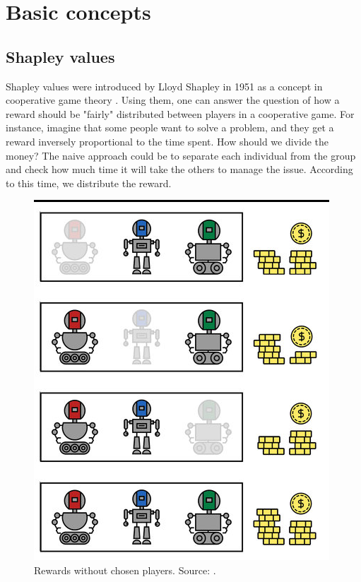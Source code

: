 \documentclass[en]{pracamgr}
\begin{document}
\chapter{Basic concepts}\label{r:concepts}


\section{Shapley values}
Shapley values were introduced by Lloyd Shapley in 1951 as a concept in cooperative game theory \cite{ShapleyValues}.
Using them, one can answer the question of how a reward should be "fairly" distributed between players in a cooperative game. For instance, imagine that some people want to solve a problem, and they get a reward inversely proportional to the time spent. How should we divide the money? The naive approach could be to separate each individual from the group and check how much time it will take the others to manage the issue. According to this time, we distribute the reward.

\begin{figure}[H]
\centering
\includegraphics[scale=0.3]{./images/Shap_coal_2.png}
\caption{Rewards without chosen players. Source: \cite{DBLP:conf/ijcai/RozemberczkiWBY22}.}
\end{figure}
\end{document}
